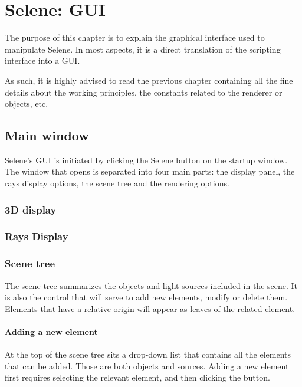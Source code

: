 \chapter{Selene: GUI}

The purpose of this chapter is to explain the graphical interface used to manipulate Selene. In most aspects, it is a direct translation of the scripting interface into a GUI.

As such, it is highly advised to read the previous chapter containing all the fine details about the working principles, the constants related to the renderer or objects, etc.

\section{Main window}

Selene's GUI is initiated by clicking the Selene button on the startup window. The window that opens is separated into four main parts: the display panel, the rays display options, the scene tree and the rendering options.

\subsection{3D display}

\subsection{Rays Display}

\subsection{Scene tree}

The scene tree summarizes the objects and light sources included in the scene. It is also the control that will serve to add new elements, modify or delete them. Elements that have a relative origin will appear as leaves of the related element.

\subsubsection{Adding a new element}

At the top of the scene tree sits a drop-down list that contains all the elements that can be added. Those are both objects and sources. Adding a new element first requires selecting the relevant element, and then clicking the  button.

